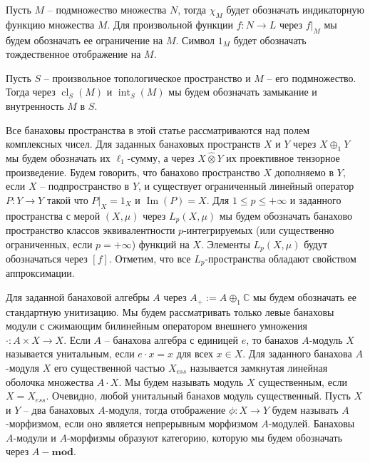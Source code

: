 \documentclass[12pt]{article}
\newcommand{\projtens}{\mathbin{\widehat{\otimes}}}
\begin{document}
Пусть $M$ -- подмножество множества $N$, тогда $\chi_M$ будет обозначать индикаторную функцию множества $M$. Для произвольной функции $f:N\to L$ через $f|_M$ мы будем обозначать ее ограничение на $M$. Символ $1_M$ будет обозначать тождественное отображение на $M$.

Пусть $S$ -- произвольное топологическое пространство и $M$ -- его подмножество. Тогда через $\operatorname{cl}_S(M)$ и $\operatorname{int}_S(M)$ мы будем обозначать замыкание и внутренность $M$ в $S$.

Все банаховы пространства в этой статье рассматриваются над полем комплексных чисел. Для заданных банаховых пространств $X$ и $Y$ через $X\oplus_1 Y$ мы будем обозначать их $\ell_1$-сумму, а через $X\projtens Y$ их проективное тензорное произведение. Будем говорить, что банахово пространство $X$ дополняемо в $Y$, если $X$ -- подпространство в $Y$, и существует ограниченный линейный оператор $P:Y\to Y$ такой что $P|_X=1_X$ и $\operatorname{Im}(P)=X$. Для $1\leq p\leq +\infty$ и заданного пространства с мерой $(X,\mu)$ через $L_p(X,\mu)$ мы будем обозначать банахово пространство классов эквивалентности $p$-интегрируемых (или существенно ограниченных, если $p=+\infty$) функций на $X$. Элементы $L_p(X,\mu)$ будут обозначаться через $[f]$. Отметим, что все $L_p$-пространства обладают свойством аппроксимации.

Для заданной банаховой алгебры $A$ через $A_+:=A\oplus_1 \mathbb{C}$ мы будем обозначать ее стандартную унитизацию. Мы будем рассматривать только левые банаховы модули с сжимающим билинейным оператором внешнего умножения $\cdot:A\times X\to X$. Если $A$ -- банахова алгебра с единицей $e$, то банахов $A$-модуль $X$ называется унитальным, если $e\cdot x=x$ для всех $x\in X$. Для заданного банахова $A$-модуля $X$ его существенной частью $X_{ess}$ называется замкнутая линейная оболочка множества $A\cdot X$. Мы будем называть модуль $X$ существенным, если $X=X_{ess}$. Очевидно, любой унитальный банахов модуль существенный. Пусть $X$ и $Y$ -- два банаховых $A$-модуля, тогда отображение $\phi:X\to Y$ будем называть $A$-морфизмом, если оно является непрерывным морфизмом $A$-модулей. Банаховы $A$-модули и $A$-морфизмы образуют категорию, которую мы будем обозначать через $A-\mathbf{mod}$.
\end{document}

